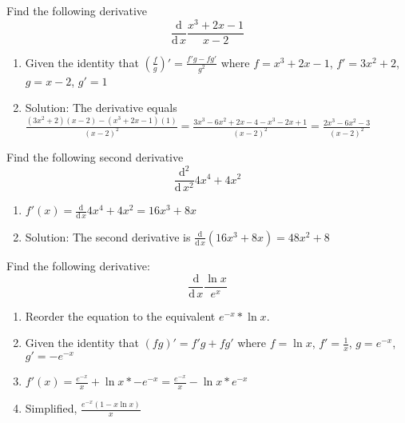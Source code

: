 \documentclass[10pt]{article}
\newenvironment{problem}[2][Problem]{\begin{trivlist}
\item[\hskip \labelsep {\bfseries #1}\hskip \labelsep {\bfseries #2.}]}{\end{trivlist}}
\begin{document}
\begin{problem}{3.4}
Find the following derivative
$$\frac{\mathrm{d}}{\mathrm{d}\, x} \frac{x^3+2x-1}{x-2}$$

\begin{enumerate}
    \item Given the identity that $(\frac{f}{g})'=\frac{f'g-fg'}{g^2}$ where $f=x^3+2x-1$, $f'=3x^2+2$, $g=x-2$, $g'=1$
    \item Solution: The derivative equals $\frac{(3x^2+2)(x-2)-(x^3+2x-1)(1)}{(x-2)^2} = \frac{
3x^3 - 6x^2 + 2 x - 4 - x^3 - 2x + 1}{(x-2)^2} = \frac{2x^3 - 6x^2 - 3}{(x-2)^2}$
\end{enumerate}
\end{problem}

\begin{problem}{3.5}
Find the following second derivative
 $$\frac{\mathrm{d^2}}{\mathrm{d}\, x^2} 4x^4+4x^2$$
 
 \begin{enumerate}
     \item $f'(x) = \frac{\mathrm{d}}{\mathrm{d}\, x} 4x^4+4x^2 = 16x^3 + 8x$
     \item Solution: The second derivative is $\frac{\mathrm{d}}{\mathrm{d}\, x}(16x^3 + 8x) = 48x^2+8$
 \end{enumerate}
\end{problem}

\begin{problem}{3.6}
Find the following derivative:
$$\frac{\mathrm{d}}{\mathrm{d}\, x} \frac{\ln x}{e^x}$$

\begin{enumerate}
    \item Reorder the equation to the equivalent $e^{-x}*\ln x$.
    \item Given the identity that $(fg)'= f'g+fg'$ where $f=\ln x$, $f'=\frac{1}{x}$, $g=e^{-x}$, $g'=-e^{-x}$
    \item $f'(x) = \frac{e^{-x}}{x} + \ln x * -e^{-x} = \frac{e^{-x}}{x} - \ln x * e^{-x}$
    \item Simplified, $\frac{e^{-x}(1 - x \ln x)}{x}$
\end{enumerate}
\end{problem}
\end{document}
